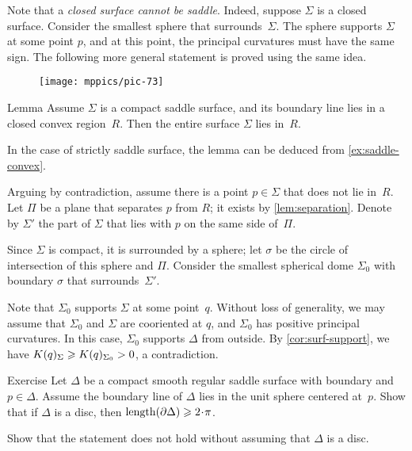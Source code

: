 Note that a \textit{closed surface cannot be saddle}.
Indeed, suppose $\Sigma$ is a closed surface.
Consider the smallest sphere that surrounds~$\Sigma$.
The sphere supports $\Sigma$ at some point $p$, and at this point, the principal curvatures must have the same sign.
The following more general statement is proved using the same idea.

{

\begin{wrapfigure}[6]{r}{45 mm}
\vskip-6mm
\centering
\texttt{[image: mppics/pic-73]}
\vskip0mm
\end{wrapfigure}

\begin{thm}{Lemma}\label{lem:convex-saddle}
Assume $\Sigma$ is a compact saddle surface, and its boundary line lies in a closed convex  region~$R$.
Then the entire surface $\Sigma$ lies in~$R$.
\end{thm}

In the case of strictly saddle surface, the lemma can be deduced from \ref{ex:saddle-convex}.

Arguing by contradiction,
assume there is a point $p\in \Sigma$ that does not lie in~$R$.
Let $\Pi$ be a plane that separates $p$ from $R$; it exists by \ref{lem:separation}.
Denote by $\Sigma'$ the part of $\Sigma$ that lies with $p$ on the same side of~$\Pi$.

}

Since $\Sigma$ is compact, it is surrounded by a sphere;
let $\sigma$ be the circle of intersection of this sphere and $\Pi$.
Consider the smallest spherical dome $\Sigma_0$ with boundary $\sigma$ that surrounds~$\Sigma'$.

Note that $\Sigma_0$ supports $\Sigma$ at some point~$q$.
Without loss of generality, we may assume that $\Sigma_0$ and $\Sigma$ are cooriented at $q$, and $\Sigma_0$ has positive principal curvatures.
In this case, $\Sigma_0$ supports $\Delta$ from outside.
By \ref{cor:surf-support}, we have $K(q)_\Sigma\z\ge K(q)_{\Sigma_0}>0$, a contradiction.
\qeds

\begin{thm}{Exercise}\label{ex:length-of-bry}
Let $\Delta$ be a compact smooth regular saddle surface with boundary and $p\in \Delta$.
Assume the boundary line of $\Delta$ lies in the unit sphere centered at~$p$.
Show that if $\Delta$ is a disc, then $\length(\partial\Delta)\ge 2\cdot\pi$.

Show that the statement does not hold without assuming that $\Delta$ is a disc.
\end{thm}

